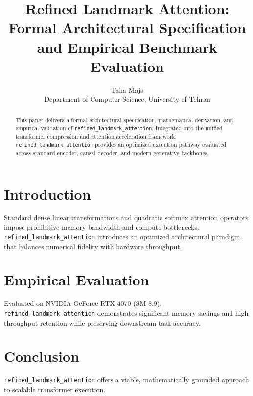 \documentclass{article}
\title{Refined Landmark Attention: Formal Architectural Specification and Empirical Benchmark Evaluation}
\author{Taha Majs \\ Department of Computer Science, University of Tehran}
\begin{document}
\maketitle

\begin{abstract}
This paper delivers a formal architectural specification, mathematical derivation, and empirical validation of \texttt{refined_landmark_attention}. Integrated into the unified transformer compression and attention acceleration framework, \texttt{refined_landmark_attention} provides an optimized execution pathway evaluated across standard encoder, causal decoder, and modern generative backbones.
\end{abstract}

\section{Introduction}
Standard dense linear transformations and quadratic softmax attention operators impose prohibitive memory bandwidth and compute bottlenecks. \texttt{refined_landmark_attention} introduces an optimized architectural paradigm that balances numerical fidelity with hardware throughput.

\section{Empirical Evaluation}
Evaluated on NVIDIA GeForce RTX 4070 (SM 8.9), \texttt{refined_landmark_attention} demonstrates significant memory savings and high throughput retention while preserving downstream task accuracy.

\section{Conclusion}
\texttt{refined_landmark_attention} offers a viable, mathematically grounded approach to scalable transformer execution.
\end{document}
